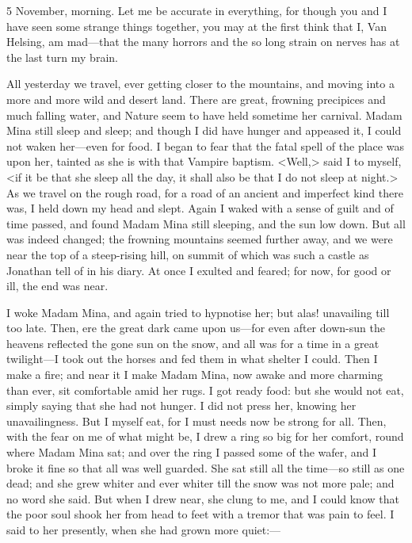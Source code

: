  

\begin{diary}{5 November, morning.}
Let me be accurate in everything, for though you and I have seen some strange things together, you may at the first think that I, Van Helsing, am mad—that the many horrors and the so long strain on nerves has at the last turn my brain.

All yesterday we travel, ever getting closer to the mountains, and moving into a more and more wild and desert land. There are great, frowning precipices and much falling water, and Nature seem to have held sometime her carnival. Madam Mina still sleep and sleep; and though I did have hunger and appeased it, I could not waken her—even for food. I began to fear that the fatal spell of the place was upon her, tainted as she is with that Vampire baptism. <Well,> said I to myself, <if it be that she sleep all the day, it shall also be that I do not sleep at night.> As we travel on the rough road, for a road of an ancient and imperfect kind there was, I held down my head and slept. Again I waked with a sense of guilt and of time passed, and found Madam Mina still sleeping, and the sun low down. But all was indeed changed; the frowning mountains seemed further away, and we were near the top of a steep-rising hill, on summit of which was such a castle as Jonathan tell of in his diary. At once I exulted and feared; for now, for good or ill, the end was near.

I woke Madam Mina, and again tried to hypnotise her; but alas! unavailing till too late. Then, ere the great dark came upon us—for even after down-sun the heavens reflected the gone sun on the snow, and all was for a time in a great twilight—I took out the horses and fed them in what shelter I could. Then I make a fire; and near it I make Madam Mina, now awake and more charming than ever, sit comfortable amid her rugs. I got ready food: but she would not eat, simply saying that she had not hunger. I did not press her, knowing her unavailingness. But I myself eat, for I must needs now be strong for all. Then, with the fear on me of what might be, I drew a ring so big for her comfort, round where Madam Mina sat; and over the ring I passed some of the wafer, and I broke it fine so that all was well guarded. She sat still all the time—so still as one dead; and she grew whiter and ever whiter till the snow was not more pale; and no word she said. But when I drew near, she clung to me, and I could know that the poor soul shook her from head to feet with a tremor that was pain to feel. I said to her presently, when she had grown more quiet:—


\end{diary}
